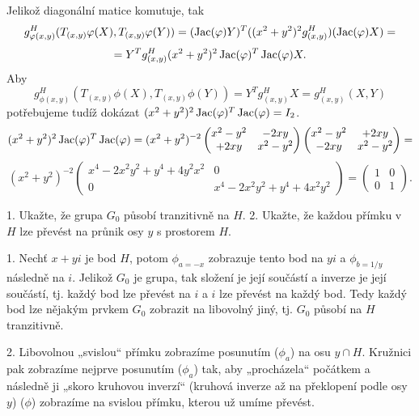 \documentclass[12pt]{article}                   %
\begin{document}
\begin{priklad}[5.1]
\begin{dukazin}
        Jelikož diagonální matice komutuje, tak
        $$ g_{\varphi(x, y)}^H(T_{(x, y)} \varphi(X), T_{(x, y)} \varphi(Y)) = (\operatorname{Jac}(\varphi)Y)^T((x^2 + y^2)^2g_{(x, y)}^H)(\operatorname{Jac}(\varphi)X) = $$
        $$ = Y^Tg_{(x, y)}^H(x^2 + y^2)^2\operatorname{Jac}(\varphi)^T\operatorname{Jac}(\varphi)X. $$
        Aby
        $$ g_{\phi(x, y)}^H(T_{(x, y)} \phi(X), T_{(x, y)} \phi(Y)) = Y^Tg^H_{(x, y)}X = g_{(x, y)}^H(X, Y) $$ 
        potřebujeme tudíž dokázat $(x^2 + y^2)^2\operatorname{Jac}(\varphi)^T\operatorname{Jac}(\varphi) = I_2$.
        $$ (x^2 + y^2)^2\operatorname{Jac}(\varphi)^T\operatorname{Jac}(\varphi) = (x^2 + y^2)^{-2} \begin{pmatrix} x^2 - y^2 & -2xy \\ +2xy & x^2 - y^2 \end{pmatrix} \begin{pmatrix} x^2 - y^2 & +2xy \\ -2xy & x^2 - y^2 \end{pmatrix} = $$ 
        $$ (x^2 + y^2)^{-2} \begin{pmatrix} x^4 - 2x^2y^2 + y^4 + 4y^2x^2 & 0 \\ 0 & x^4 - 2x^2y^2 + y^4 + 4x^2y^2 \end{pmatrix} = \begin{pmatrix} 1 & 0 \\ 0 & 1 \end{pmatrix}. $$
        \end{dukazin}
\end{priklad}

\pagebreak

\begin{priklad}[5.2]
    1. Ukažte, že grupa $G_0$ působí tranzitivně na $H$. 2. Ukažte, že každou přímku v $H$ lze převést na průnik osy $y$ s prostorem $H$.

    \begin{dukazin}
        1. Nechť $x + yi$ je bod $H$, potom $\phi_{a = -x}$ zobrazuje tento bod na $yi$ a $\phi_{b = 1/y}$ následně na $i$. Jelikož $G_0$ je grupa, tak složení je její součástí a inverze je její součástí, tj. každý bod lze převést na $i$ a $i$ lze převést na každý bod. Tedy každý bod lze nějakým prvkem $G_0$ zobrazit na libovolný jiný, tj. $G_0$ působí na $H$ tranzitivně.

        2. Libovolnou „svislou“ přímku zobrazíme posunutím ($\phi_a$) na osu $y \cap H$. Kružnici pak zobrazíme nejprve posunutím ($\phi_a$) tak, aby „procházela“ počátkem a následně ji „skoro kruhovou inverzí“ (kruhová inverze až na překlopení podle osy $y$) ($\phi$) zobrazíme na svislou přímku, kterou už umíme převést.
    \end{dukazin}
\end{priklad}
\end{document}
